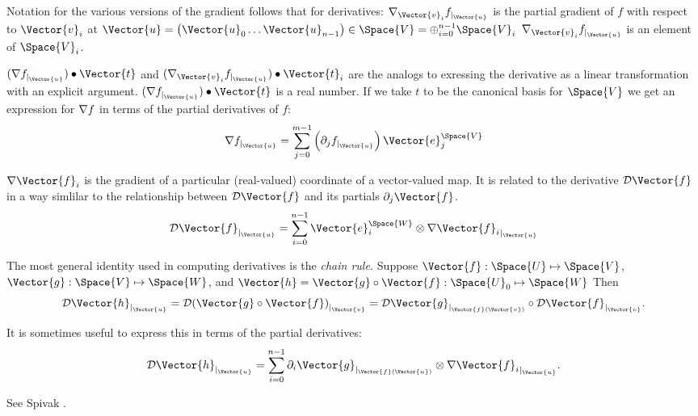 Notation for the various versions of the gradient
follows that for derivatives:
$\Gc{\Vector{v}_i}{f}{\Vector{u}}$ is the partial gradient of $f$ with respect to $\Vector{v}_i$ at
$\Vector{u} = \left( \Vector{u}_0 \ldots \Vector{u}_{n-1} \right) \in \Space{V} = \oplus_{i=0}^{n-1} \Space{V}_i$
$\Gc{\Vector{v}_i}{f}{\Vector{u}}$ is an element of $\Space{V}_i$.

$(\Gb{f}{\Vector{u}}) \bullet  \Vector{t}$
and
$(\Gc{\Vector{v}_i}{f}{\Vector{u}}) \bullet \Vector{t}_i$
are the analogs to exressing the derivative as a linear transformation
with an explicit argument.
$(\Gb{f}{\Vector{u}}) \bullet  \Vector{t}$ is a real number.
If we take $t$ to be the canonical basis for $\Space{V}$
we get an expression for ${\mathbf \nabla}{f}$ in terms of the partial derivatives of $f$:
\begin{equation}
\label{eq:gradient-from-partials}
\Gb{f}{\Vector{u}} = \sum_{j=0}^{m-1} \left( \db{j}{f}{\Vector{u}} \right) \Vector{e}_j^{\Space{V}}
\end{equation}

$\Ga{\Vector{f}_i}$ is the gradient of a particular (real-valued) coordinate
of a vector-valued map. It is related to the derivative $\Da{\Vector{f}}$
in a way simlilar to the relationship between $\Da{\Vector{f}}$ and its partials $\da{j}{\Vector{f}}$.
\begin{equation}
\Db{\Vector{f}}{\Vector{u}} = \sum_{i=0}^{n-1}  \Vector{e}_i^{\Space{W}} \otimes \Gb{\Vector{f}_i}{\Vector{u}}
\end{equation}

The most general identity used in computing derivatives is the {\it chain rule.}
Suppose
$\Vector{f}:\Space{U} \mapsto \Space{V}$,
$\Vector{g}:\Space{V} \mapsto \Space{W}$,
and
$\Vector{h} = \Vector{g} \circ \Vector{f} : \Space{U}_0 \mapsto \Space{W}$
Then
\begin{equation}
\label{eq:chain-rule}
\Db{\Vector{h}}{\Vector{u}}
=  \Db{(\Vector{g} \circ \Vector{f})}{\Vector{v}}
=  \Db{\Vector{g}}{\Vector{f}(\Vector{v})}  \circ  \Db{\Vector{f}} {\Vector{v}}.
\end{equation}

It is sometimes useful to express this in terms of the partial derivatives:
\begin{equation}
\label{eq:chain-rule_partials}
\Db{\Vector{h}}{\Vector{u}} =  \sum_{i=0}^{n-1} \db{i}{\Vector{g}}{\Vector{f}(\Vector{u})} \otimes  \Gb{\Vector{f}_i}{\Vector{u}}.
\end{equation}

See Spivak \cite[Theorem~2-2]{Spivak:1965:CalculusOnManifolds}.


